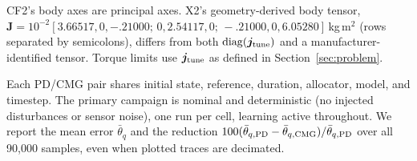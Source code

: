 \documentclass[letterpaper, 10 pt, conference]{ieeeconf}
\begin{document}

CF2's body axes are principal axes. X2's geometry-derived body tensor,
$\bm J=10^{-2}[3.66517,0,-.21000;\allowbreak\,0,2.54117,0;\allowbreak\,-.21000,0,6.05280]$\,kg\,m$^2$
(rows separated by semicolons), differs from both
$\operatorname{diag}(\bm j_{\rm tune})$ and a manufacturer-identified
tensor. Torque limits use $\bm j_{\rm tune}$ as defined in Section~\ref{sec:problem}.

Each PD/CMG pair shares initial state, reference, duration, allocator, model, and timestep. The primary campaign is nominal and deterministic (no injected disturbances or sensor noise), one run per cell, learning active throughout. We report the mean error $\bar\theta_q$ and the reduction $100(\bar\theta_{q,\rm PD}-\bar\theta_{q,\rm CMG})/\bar\theta_{q,\rm PD}$ over all 90{,}000 samples, even when plotted traces are decimated.
\end{document}

